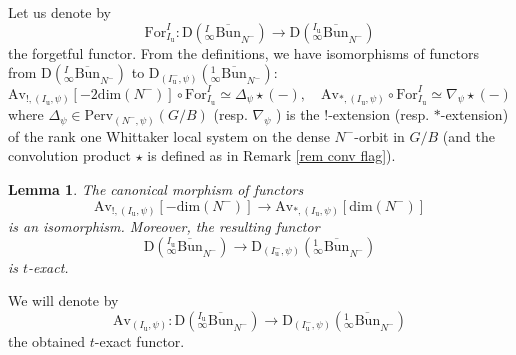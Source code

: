 \documentclass[11pt]{amsart}
\theoremstyle{plain}
\newtheorem{lem}[thm]{Lemma}
\theoremstyle{remark}
\numberwithin{equation}{section}
\begin{document}
 Let us denote by 
 $$\mathrm{For}^I_{I_\mathrm{u}}:\mathrm{D}({_{ \infty}^{I}\overline{\mathrm{Bun}}}_{N^-})\to \mathrm{D}({_{ \infty}^{I_\mathrm{u}}\overline{\mathrm{Bun}}}_{N^-})$$
 the forgetful functor. From the definitions, we have isomorphisms of functors from $\mathrm{D}({_{ \infty}^{I}\overline{\mathrm{Bun}}}_{N^-})$ to $ \mathrm{D}_{(I^-_\mathrm{u},\psi)}({_{ \infty}^1\overline{\mathrm{Bun}}}_{N^-})$:
  \begin{equation}\label{eq averaging}
      \mathrm{Av}_{!,(I_\mathrm{u},\psi)}[-2\mathrm{dim}(N^-)]\circ\mathrm{For}^I_{I_\mathrm{u}}\simeq \Delta_\psi\star(-),\quad \mathrm{Av}_{*,(I_\mathrm{u},\psi)}\circ\mathrm{For}^I_{I_\mathrm{u}}\simeq \nabla_\psi\star(-) 
  \end{equation}
     where $\Delta_\psi\in \mathrm{Perv}_{(N^-,\psi)}(G/B)$ (resp. $\nabla_\psi$ ) is the $!$-extension (resp. $*$-extension) of the rank one Whittaker local system on the dense $N^-$-orbit in $G/B$  (and the convolution product $\star$ is defined as in Remark \ref{rem conv flag}).
	\begin{lem}{{\cite[Lemma 4.4.12]{ABBGM}}}\label{lem averaging}
		The canonical morphism of functors
		$$\mathrm{Av}_{!,(I_\mathrm{u},\psi)}[-\mathrm{dim}(N^-)]\to \mathrm{Av}_{*,(I_\mathrm{u},\psi)}[\mathrm{dim}(N^-)]$$
		is an isomorphism. Moreover, the resulting functor
		$$\mathrm{D}({_{ \infty}^{I_\mathrm{u}}\overline{\mathrm{Bun}}}_{N^-})\to  \mathrm{D}_{(I^-_\mathrm{u},\psi)}({_{ \infty}^1\overline{\mathrm{Bun}}}_{N^-})$$
		is $t$-exact.
	\end{lem}
 We will denote by 
	$$\mathrm{Av}_{(I_\mathrm{u},\psi)}:\mathrm{D}({_{ \infty}^{I_\mathrm{u}}\overline{\mathrm{Bun}}}_{N^-})\to  \mathrm{D}_{(I^-_\mathrm{u},\psi)}({_{ \infty}^1\overline{\mathrm{Bun}}}_{N^-}) $$
	the obtained $t$-exact functor.
\end{document}
